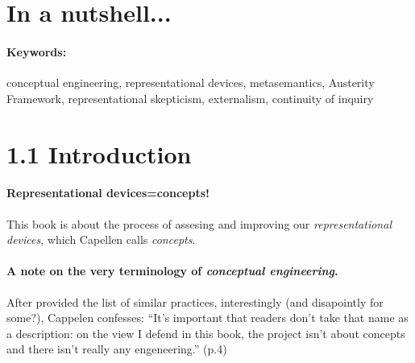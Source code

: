 \documentclass[
10pt, %
a4paper, %
twocolumn, %
landscape %
]{article}
\begin{document}
\pagestyle{myheadings} %
\markright{\doctitle} %


\thispagestyle{plain} %

\printtitle %


\section*{In a nutshell... }


\paragraph{Keywords:}
conceptual engineering,
representational devices,
metasemantics,
Austerity Framework,
representational skepticism,
externalism,
continuity of inquiry

\section*{1.1 Introduction}
\paragraph{Representational devices=concepts!}
This book is about the process of assesing and improving our \emph{representational devices}, which Capellen calls \emph{concepts}.

\paragraph{A note on the very terminology of \emph{conceptual engineering}. }
After provided the list of similar practices, interestingly (and disapointly for some?), Cappelen confesses:
``It's important that readers don't take that name as a description: on the view I defend in this book, the project isn't about concepts and there isn't really any engeneering.'' (p.4)
\end{document}

